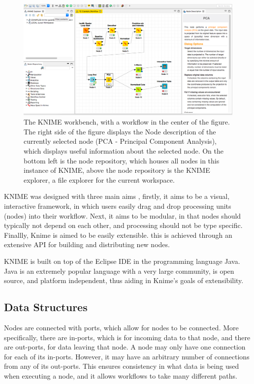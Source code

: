 \documentclass[11pt,openany]{book}
\begin{document}
\begin{figure}[H]
    \centering
    \includegraphics[width=\textwidth]{./images/knime_workbench_workflow_img.png}
    \caption{The KNIME workbench, with a workflow in the center of the figure. The right side of the figure displays the Node description of the currently selected node (PCA - Principal Component Analysis), which displays useful information about the selected node. On the bottom left is the node repository, which houses all nodes in this instance of KNIME, above the node repository is the KNIME explorer, a file explorer for the current workspace.}
    \label{fig:knime_workbench_workflow_img}
\end{figure}

KNIME was designed with three main aims \cite{KNIME_Basic_info}, firstly, it aims to be a visual, interactive framework, in which users easily drag and drop processing units (nodes) into their workflow. Next, it aims to be modular, in that nodes should typically not depend on each other, and processing should not be type specific. Finallly, Knime is aimed to be easily extensible. this is achieved through an extensive API \cite{KNIME_API_URL} for building and distributing new nodes.

KNIME is built on top of the Eclipse IDE in the programming language Java. Java is an extremely popular language with a very large community, is open source, and platform independent, thus aiding in Knime's goals of extensibility. 

\subsection{Data Structures}
\label{subsection:Background/KNIME/Data_Structures}
Nodes are connected with ports, which allow for nodes to be connected. More specifically, there are in-ports, which is for incoming data to that node, and there are out-ports, for data leaving that node. A node may only have one connection for each of its in-ports. However, it may have an arbitrary number of connections from any of its out-ports. This ensures consistency in what data is being used when executing a node, and it allows workflows to take many different paths.
\end{document}
